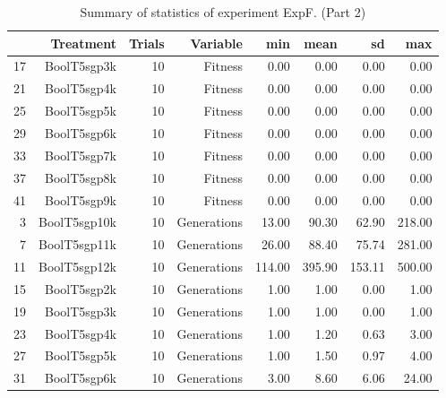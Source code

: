 \begin{table}[ht]
\centering
\begin{tabular}{rrrrrrrr}
  \hline
 & Treatment & Trials & Variable & min & mean & sd & max \\ 
  \hline
17 & BoolT5sgp3k &  10 & Fitness & 0.00 & 0.00 & 0.00 & 0.00 \\ 
  21 & BoolT5sgp4k &  10 & Fitness & 0.00 & 0.00 & 0.00 & 0.00 \\ 
  25 & BoolT5sgp5k &  10 & Fitness & 0.00 & 0.00 & 0.00 & 0.00 \\ 
  29 & BoolT5sgp6k &  10 & Fitness & 0.00 & 0.00 & 0.00 & 0.00 \\ 
  33 & BoolT5sgp7k &  10 & Fitness & 0.00 & 0.00 & 0.00 & 0.00 \\ 
  37 & BoolT5sgp8k &  10 & Fitness & 0.00 & 0.00 & 0.00 & 0.00 \\ 
  41 & BoolT5sgp9k &  10 & Fitness & 0.00 & 0.00 & 0.00 & 0.00 \\ 
  3 & BoolT5sgp10k &  10 & Generations & 13.00 & 90.30 & 62.90 & 218.00 \\ 
  7 & BoolT5sgp11k &  10 & Generations & 26.00 & 88.40 & 75.74 & 281.00 \\ 
  11 & BoolT5sgp12k &  10 & Generations & 114.00 & 395.90 & 153.11 & 500.00 \\ 
  15 & BoolT5sgp2k &  10 & Generations & 1.00 & 1.00 & 0.00 & 1.00 \\ 
  19 & BoolT5sgp3k &  10 & Generations & 1.00 & 1.00 & 0.00 & 1.00 \\ 
  23 & BoolT5sgp4k &  10 & Generations & 1.00 & 1.20 & 0.63 & 3.00 \\ 
  27 & BoolT5sgp5k &  10 & Generations & 1.00 & 1.50 & 0.97 & 4.00 \\ 
  31 & BoolT5sgp6k &  10 & Generations & 3.00 & 8.60 & 6.06 & 24.00 \\ 
   \hline
\end{tabular}
\caption{Summary of statistics of experiment ExpF. (Part 2)} 
\end{table}
